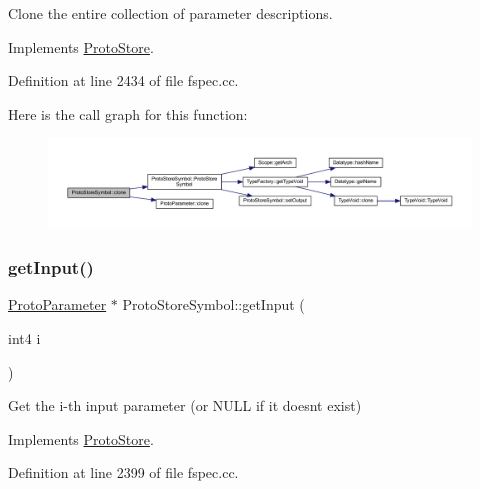 Clone the entire collection of parameter descriptions. 



Implements \mbox{\hyperlink{class_proto_store_aaefd44fa7803bbeb4d91059cc6480419}{Proto\+Store}}.



Definition at line 2434 of file fspec.\+cc.

Here is the call graph for this function\+:
\nopagebreak
\begin{figure}[H]
\begin{center}
\leavevmode
\includegraphics[width=350pt]{class_proto_store_symbol_aa6631290325889edb7ef7699fdd8a90f_cgraph}
\end{center}
\end{figure}
\mbox{\label{class_proto_store_symbol_a55788c21f1b3699731f1956d75ef1d45}} 
\subsubsection{\texorpdfstring{getInput()}{getInput()}}
{\footnotesize\ttfamily \mbox{\hyperlink{class_proto_parameter}{Proto\+Parameter}} $\ast$ Proto\+Store\+Symbol\+::get\+Input (\begin{DoxyParamCaption}\item[{int4}]{i }\end{DoxyParamCaption})\hspace{0.3cm}{\ttfamily [virtual]}}



Get the i-\/th input parameter (or N\+U\+LL if it doesn\textquotesingle{}t exist) 



Implements \mbox{\hyperlink{class_proto_store_a97623d0ed5720f94d7c671edccbd9142}{Proto\+Store}}.



Definition at line 2399 of file fspec.\+cc.

